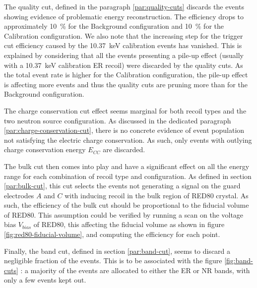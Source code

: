 The quality cut, defined in the paragraph \ref{par:quality-cuts} discards the events showing evidence of problematic energy reconstruction. The efficiency drops to approximately \SI{10}{\percent} for the Background configuration and \SI{10}{\percent} for the Calibration configuration. We also note that the increasing step for the trigger cut efficiency caused by the \SI{10.37}{\kilo\eV} calibration events has vanished. This is explained by considering that all the events presenting a pile-up effect (usually with a \SI{10.37}{\kilo\eV} calibration ER recoil) were discarded by the quality cuts. As the total event rate is higher for the Calibration configuration, the pile-up effect is affecting more events and thus the quality cuts are pruning more than for the Background configuration.

The charge conservation cut effect seems marginal for both recoil types and the two neutron source configuration. As discussed in the dedicated paragraph \ref{par:charge-conservation-cut}, there is no concrete evidence of event population not satisfying the electric charge conservation. As such, only events with outlying charge conservation energy $E_{CC}$ are discarded.


The bulk cut then comes into play and have a significant effect on all the energy range for each combination of recoil type and configuration. As defined in section \ref{par:bulk-cut}, this cut selects the events not generating a signal on the guard electrodes $A$ and $C$ with inducing recoil in the bulk region of RED80 crystal. As such, the efficiency of the bulk cut should be proportional to the fiducial volume of RED80. This assumption could be verified by running a scan on the voltage bias $V_{bias}$ of RED80, this affecting the fiducial volume as shown in figure \ref{fig:red80-fiducial-volume}, and computing the efficiency for each point.

Finally, the band cut, defined in section \ref{par:band-cut}, seems to discard a negligible fraction of the events. This is to be associated with the figure \ref{fig:band-cuts} : a majority of the events are allocated to either the ER or NR bands, with only a few events kept out.


